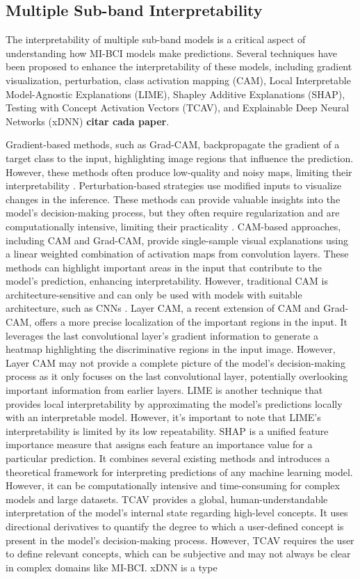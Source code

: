 \subsection{Multiple Sub-band Interpretability}

The interpretability of multiple sub-band models is a critical aspect of understanding how MI-BCI models make predictions. Several techniques have been proposed to enhance the interpretability of these models, including gradient visualization, perturbation, class activation mapping (CAM), Local Interpretable Model-Agnostic Explanations (LIME), Shapley Additive Explanations (SHAP), Testing with Concept Activation Vectors (TCAV), and Explainable Deep Neural Networks (xDNN) \textbf{citar cada paper}.

Gradient-based methods, such as Grad-CAM, backpropagate the gradient of a target class to the input, highlighting image regions that influence the prediction. However, these methods often produce low-quality and noisy maps, limiting their interpretability \cite{omeiza2019smooth}. Perturbation-based strategies use modified inputs to visualize changes in the inference. These methods can provide valuable insights into the model's decision-making process, but they often require regularization and are computationally intensive, limiting their practicality \cite{fong2017interpretable}. CAM-based approaches, including CAM and Grad-CAM, provide single-sample visual explanations using a linear weighted combination of activation maps from convolution layers. These methods can highlight important areas in the input that contribute to the model's prediction, enhancing interpretability. However, traditional CAM is architecture-sensitive and can only be used with models with suitable architecture, such as CNNs \cite{wang2020score}. Layer CAM, a recent extension of CAM and Grad-CAM, offers a more precise localization of the important regions in the input. It leverages the last convolutional layer's gradient information to generate a heatmap highlighting the discriminative regions in the input image. However, Layer CAM may not provide a complete picture of the model's decision-making process as it only focuses on the last convolutional layer, potentially overlooking important information from earlier layers. LIME is another technique that provides local interpretability by approximating the model's predictions locally with an interpretable model. However, it's important to note that LIME's interpretability is limited by its low repeatability. SHAP is a unified feature importance measure that assigns each feature an importance value for a particular prediction. It combines several existing methods and introduces a theoretical framework for interpreting predictions of any machine learning model. However, it can be computationally intensive and time-consuming for complex models and large datasets. TCAV provides a global, human-understandable interpretation of the model's internal state regarding high-level concepts. It uses directional derivatives to quantify the degree to which a user-defined concept is present in the model's decision-making process. However, TCAV requires the user to define relevant concepts, which can be subjective and may not always be clear in complex domains like MI-BCI. xDNN is a type 